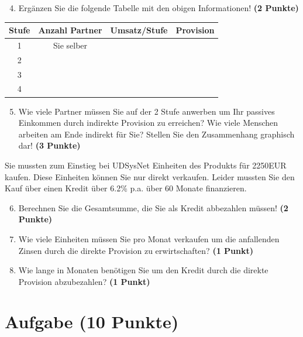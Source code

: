 \documentclass[a4paper, 9pt]{scrartcl}\usepackage[]{graphicx}\usepackage[]{xcolor}
\begin{document}
\begin{enumerate}
  \setcounter{enumi}{3}
\item Erg{\"a}nzen Sie die folgende Tabelle mit den obigen Informationen! \textbf{(2 Punkte)}
\end{enumerate}

\begin{center}
\begin{tabular}{c|c|c|c}
  \toprule
  \textbf{Stufe} & \textbf{Anzahl Partner}  & \textbf{Umsatz/Stufe} & \textbf{Provision}\\
  \midrule
  1 & Sie selber  &  & \\ \midrule
  2 &   &  &  \\ \midrule
  3 &   &  &  \\ \midrule
  4 &   &  &  \\
  \bottomrule
\end{tabular}
\end{center}

\begin{enumerate}
  \setcounter{enumi}{4}
\item Wie viele Partner m{\"u}ssen Sie auf der 2 Stufe anwerben um Ihr passives
  Einkommen durch indirekte Provision zu erreichen? Wie viele Menschen
  arbeiten am Ende indirekt f{\"u}r Sie? Stellen Sie den
  Zusammenhang graphisch dar!  \textbf{(3 Punkte)}
\end{enumerate}

Sie mussten zum Einstieg bei UDSysNet Einheiten des Produkts
f{\"u}r 2250EUR kaufen. Diese Einheiten k{\"o}nnen Sie nur direkt
verkaufen. Leider mussten Sie den Kauf {\"u}ber einen Kredit {\"u}ber
6.2\% p.a. {\"u}ber 60 Monate finanzieren.

\begin{enumerate}
  \setcounter{enumi}{5}
\item Berechnen Sie die Gesamtsumme, die Sie als Kredit abbezahlen m{\"u}ssen! \textbf{(2 Punkte)}
\item Wie viele Einheiten m{\"u}ssen Sie pro Monat verkaufen um die anfallenden Zinsen
  durch die direkte Provision zu erwirtschaften? \textbf{(1 Punkt)}
\item Wie lange in
  Monaten ben{\"o}tigen Sie um den Kredit durch die direkte
  Provision abzubezahlen? \textbf{(1 Punkt)}
\end{enumerate} 
\clearpage

\section{Aufgabe \hfill (10 Punkte)}
\end{document}
